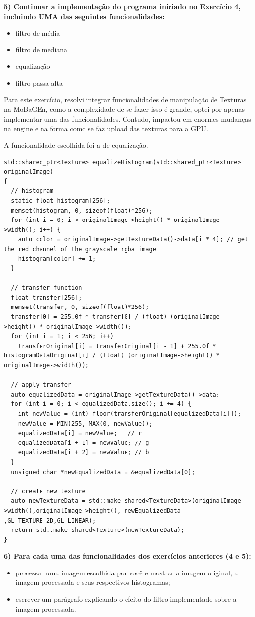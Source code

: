 \documentclass[a4paper]{sbgames}               %
\begin{document}
\textbf{5) Continuar a implementação do programa iniciado no Exercício 4, incluindo UMA das seguintes funcionalidades:}

\begin{itemize}
\item filtro de média
\item filtro de mediana
\item equalização
\item filtro passa-alta
\end{itemize}

Para este exercício, resolvi integrar funcionalidades de manipulação de Texturas na MoBaGEn, como a complexidade de se fazer isso é grande, optei por apenas implementar uma das funcionalidades. Contudo, impactou em enormes mudanças na engine e na forma como se faz upload das texturas para a GPU.

A funcionalidade escolhida foi a de equalização.
\pagebreak
\begin{lstlisting}
std::shared_ptr<Texture> equalizeHistogram(std::shared_ptr<Texture> originalImage)
{
  // histogram
  static float histogram[256];
  memset(histogram, 0, sizeof(float)*256);
  for (int i = 0; i < originalImage->height() * originalImage->width(); i++) {
    auto color = originalImage->getTextureData()->data[i * 4]; // get the red channel of the grayscale rgba image
    histogram[color] += 1;
  }
  
  // transfer function
  float transfer[256];
  memset(transfer, 0, sizeof(float)*256);
  transfer[0] = 255.0f * transfer[0] / (float) (originalImage->height() * originalImage->width());
  for (int i = 1; i < 256; i++)
    transferOriginal[i] = transferOriginal[i - 1] + 255.0f * histogramDataOriginal[i] / (float) (originalImage->height() * originalImage->width());
  
  // apply transfer
  auto equalizedData = originalImage->getTextureData()->data;
  for (int i = 0; i < equalizedData.size(); i += 4) {
    int newValue = (int) floor(transferOriginal[equalizedData[i]]);
    newValue = MIN(255, MAX(0, newValue));
    equalizedData[i] = newValue;   // r
    equalizedData[i + 1] = newValue; // g
    equalizedData[i + 2] = newValue; // b
  }
  unsigned char *newEqualizedData = &equalizedData[0];

  // create new texture
  auto newTextureData = std::make_shared<TextureData>(originalImage->width(),originalImage->height(), newEqualizedData ,GL_TEXTURE_2D,GL_LINEAR);
  return std::make_shared<Texture>(newTextureData);
}
\end{lstlisting}
\pagebreak
\textbf{6)  Para cada uma das funcionalidades dos exercícios anteriores (4 e 5):}
\begin{itemize}
\item processar uma imagem escolhida por você e mostrar a imagem original, a imagem processada e seus respectivos histogramas;
\item escrever um parágrafo explicando o efeito do filtro implementado sobre a imagem processada.
\end{itemize}
\end{document}
